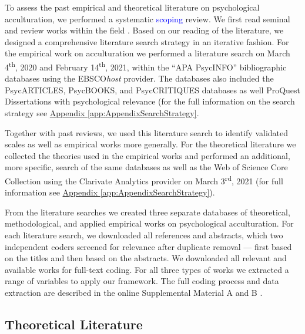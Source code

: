 \newcommand{\nTheo}{92}
\newcommand{\nMeth}{233}
\newcommand{\nEmp}{526}

To assess the past empirical and theoretical literature on psychological
acculturation, we performed a systematic \textcolor{blue}{scoping}
review. We first read seminal and review works within the field
\citep[including,][]{Ward2019, Berry1997b, Berry2003, Szapocznik1978, Sam2006a, Rudmin2003a}.
Based on our reading of the literature, we designed a comprehensive
literature search strategy in an iterative fashion. For the empirical
work on acculturation we performed a literature search on March
4\textsuperscript{th}, 2020 and February 14\textsuperscript{th}, 2021,
within the ``APA PsycINFO'' bibliographic databases using the
EBSCO\textit{host} provider. The databases also included the
PsycARTICLES, PsycBOOKS, and PsycCRITIQUES databases as well ProQuest
Dissertations with psychological relevance (for the full information on
the search strategy see
\hyperref[app:AppendixSearchStrategy]{Appendix \ref*{app:AppendixSearchStrategy}}.

Together with past reviews, we used this literature search to identify
validated scales as well as empirical works more generally. For the
theoretical literature we collected the theories used in the empirical
works and performed an additional, more specific, search of the same
databases as well as the Web of Science Core Collection using the
Clarivate Analytics provider on March 3\textsuperscript{rd}, 2021 (for
full information see
\hyperref[app:AppendixSearchStrategy]{Appendix \ref*{app:AppendixSearchStrategy}}).

From the literature searches we created three separate databases of
theoretical, methodological, and applied empirical works on
psychological acculturation. For each literature search, we downloaded
all references and abstracts, which two independent coders screened for
relevance after duplicate removal --- first based on the titles and then
based on the abstracts. We downloaded all relevant and available works
for full-text coding. For all three types of works we extracted a range
of variables to apply our framework. The full coding process and data
extraction are described in the online Supplemental Material A and B
\citep[also see our repositories;][]{Kreienkamp2021d, Kreienkamp2021e}.

\subsection{Theoretical Literature}

